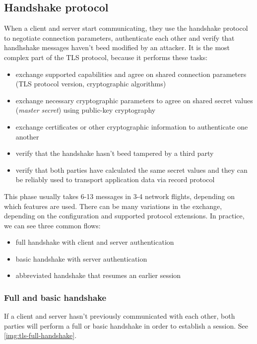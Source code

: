 \subsection{Handshake protocol}

When a client and server start communicating, they use the handshake protocol to negotiate connection parameters, authenticate each other and verify that handhshake messages haven't beed modified by an attacker. It is the most complex part of the TLS protocol, because it performs these tasks:

\begin{itemize}
  \item exchange supported capabilities and agree on shared connection parameters (TLS protocol version, cryptographic algorithms)
  \item exchange necessary cryptographic parameters to agree on shared secret values (\textit{master secret}) using public-key cryptography
  \item exchange certificates or other cryptographic information to authenticate one another
  \item verify that the handshake hasn't beed tampered by a third party
  \item verify that both parties have calculated the same secret values and they can be reliably used to transport application data via record protocol
\end{itemize}

This phase usually takes 6-13 messages in 3-4 network flights, depending on which features are used. There can be many variations in the exchange, depending on the configuration and supported protocol extensions. In practice, we can see three common flows:

\begin{itemize}
  \item full handshake with client and server authentication
  \item basic handshake with server authentication
  \item abbreviated handshake that resumes an earlier session
\end{itemize}

\subsubsection{Full and basic handshake}

If a client and server hasn't previously communicated with each other, both parties will perform a full or basic handshake in order to establish a session. See \autoref{img:tls-full-handshake}.

